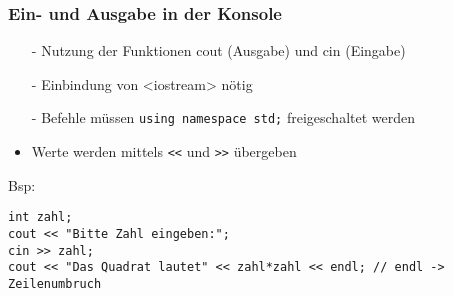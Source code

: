 \subsubsection{Ein- und Ausgabe in der Konsole}
\begin{itemize}
\item[-] Nutzung der Funktionen cout (Ausgabe) und cin (Eingabe)
\item[-] Einbindung von <iostream> nötig
\item[-] Befehle müssen \lstinline{using namespace std;} freigeschaltet werden
\item[-] Werte werden mittels \lstinline{<<} und \lstinline{>>} übergeben
\end{itemize}
Bsp:
\begin{lstlisting}
int zahl;
cout << "Bitte Zahl eingeben:";
cin >> zahl;
cout << "Das Quadrat lautet" << zahl*zahl << endl; // endl -> Zeilenumbruch
\end{lstlisting}